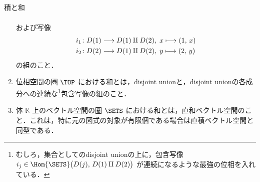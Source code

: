 \documentclass[TQFT_main]{subfiles}
\begin{document}
\begin{myexample}[label=def:product-coproduct]{積と和}
\begin{enumerate}
\begin{align}
        \end{align}
        および写像
        \begin{align}
            i_1 \colon D(1) &\longrightarrow D(1) \amalg D(2),\; x \longmapsto (1,\, x) \\
            i_2 \colon D(2) &\longrightarrow D(1) \amalg D(2),\; y \longmapsto (2,\, y)
        \end{align}
        の組のこと．
        \item 位相空間の圏 $\TOP$ における和とは，disjoint unionと，disjoint unionの各成分への連続な\footnote{むしろ，集合としてのdisjoint unionの上に，包含写像 $i_j \in \Hom{\SETS} \bigl( D(j),\, D(1) \amalg D(2) \bigr)$ が連続になるような最強の位相を入れている．}包含写像の組のこと．
        \item 体 $\mathbb{K}$ 上のベクトル空間の圏 $\SETS$ における和とは，直和ベクトル空間のこと．これは，特に元の図式の対象が有限個である場合は直積ベクトル空間と同型である．
    \end{enumerate}
\end{myexample}
\end{document}
